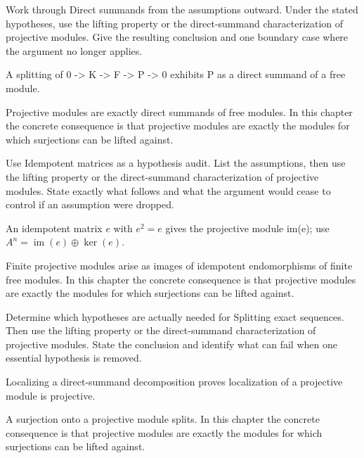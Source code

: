 \begin{exercise}\label{exr:v13-04}
Work through Direct summands from the assumptions outward. Under the stated hypotheses, use the lifting property or the direct-summand characterization of projective modules. Give the resulting conclusion and one boundary case where the argument no longer applies.
\end{exercise}
\begin{hint}
A splitting of 0 -> K -> F -> P -> 0 exhibits P as a direct summand of a free module.
\end{hint}
\begin{solution}
Projective modules are exactly direct summands of free modules. In this chapter the concrete consequence is that projective modules are exactly the modules for which surjections can be lifted against.
\end{solution}

\begin{exercise}\label{exr:v13-05}
Use Idempotent matrices as a hypothesis audit. List the assumptions, then use the lifting property or the direct-summand characterization of projective modules. State exactly what follows and what the argument would cease to control if an assumption were dropped.
\end{exercise}
\begin{hint}
An idempotent matrix \(e\) with \(e^2=e\) gives the projective module im(e); use \(A^n=\operatorname{im}(e)\oplus\ker(e)\).
\end{hint}
\begin{solution}
Finite projective modules arise as images of idempotent endomorphisms of finite free modules. In this chapter the concrete consequence is that projective modules are exactly the modules for which surjections can be lifted against.
\end{solution}

\begin{exercise}\label{exr:v13-06}
Determine which hypotheses are actually needed for Splitting exact sequences. Then use the lifting property or the direct-summand characterization of projective modules. State the conclusion and identify what can fail when one essential hypothesis is removed.
\end{exercise}
\begin{hint}
Localizing a direct-summand decomposition proves localization of a projective module is projective.
\end{hint}
\begin{solution}
A surjection onto a projective module splits. In this chapter the concrete consequence is that projective modules are exactly the modules for which surjections can be lifted against.
\end{solution}

